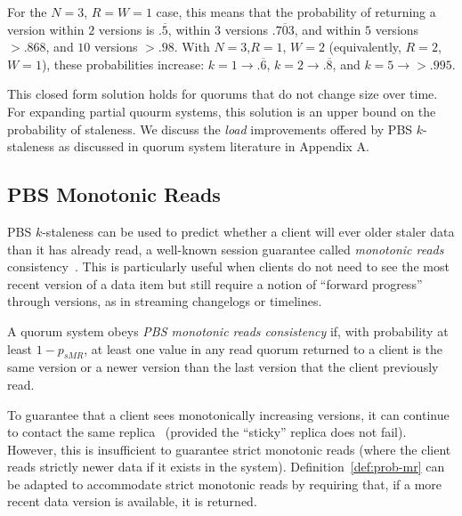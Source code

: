 \documentclass{vldb}
\newcommand{\subsectionskip}{-0em}
\begin{document}
For the $N$$=$$3$, $R$$=$$W$$=$$1$ case, this means that the
probability of returning a version within $2$ versions is
$.\overline{5}$, within $3$ versions $.\overline{703}$, and within $5$
versions $> .868$, and $10$ versions $>.98$.  With
$N$$=$$3$,$R$$=$$1$, $W$$=$$2$ (equivalently, $R$$=$$2$, $W$$=$$1$),
these probabilities increase: $k$$=$$1 \rightarrow .\overline{6}$, $k$$=$$2
\rightarrow .\overline{8}$, and $k$$=$$5 \rightarrow > .995$.

This closed form solution holds for quorums that do not change size
over time.  For expanding partial quourm systems, this solution is an
upper bound on the probability of staleness.  We discuss the
\textit{load} improvements offered by PBS $k$-staleness as discussed
in quorum system literature in Appendix A.

\vspace{\subsectionskip}\subsection{PBS Monotonic Reads}

PBS $k$-staleness can be used to predict whether a client will ever
older staler data than it has already read, a well-known session
guarantee called \textit{monotonic reads}
consistency~\cite{sessionguarantees}.  This is particularly useful
when clients do not need to see the most recent version of a data item
but still require a notion of ``forward progress'' through versions,
as in streaming changelogs or timelines.

\begin{definition}
\label{def:prob-mr}
A quorum system obeys \textit{PBS monotonic reads consistency} if,
with probability at least $1-p_{sMR}$, at least one value in any
read quorum returned to a client is the same version or a newer
version than the last version that the client previously read.
\end{definition}

To guarantee that a client sees monotonically increasing versions, it
can continue to contact the same replica~\cite{vogels-defs} (provided
the ``sticky'' replica does not fail).  However, this is insufficient to
guarantee strict monotonic reads (where the client reads strictly
newer data if it exists in the system).  Definition~\ref{def:prob-mr}
can be adapted to accommodate strict monotonic reads by requiring
that, if a more recent data version is available, it is returned.
\end{document}
